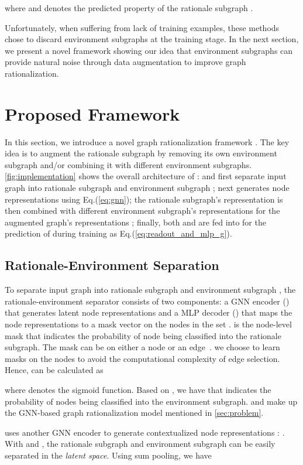 \documentclass[sigconf]{acmart}
\begin{document}
where  and  denotes the predicted property of the rationale subgraph .

Unfortunately, when suffering from lack of training examples, these methods chose to discard environment subgraphs at the training stage. 
In the next section, we present a novel framework showing our idea that environment subgraphs can provide natural noise through data augmentation to improve graph rationalization.
%
 
\section{Proposed Framework}
\label{sec:method}
In this section, we introduce a novel graph rationalization framework \method. The key idea is to augment the rationale subgraph by removing its own environment subgraph and/or combining it with different environment subgraphs. \cref{fig:implementation} shows the overall architecture of \method:
 and  first separate input graph  into rationale subgraph  and environment subgraph ;
 next generates node representations  using Eq.(\ref{eq:gnn}); 
the rationale subgraph's representation  is then combined with different environment subgraph's representations  for the augmented graph's representations ; 
finally, both  and  are fed into  for the prediction of  during training as Eq.(\ref{eq:readout_and_mlp_g}).

\subsection{Rationale-Environment Separation} 
\label{sec:gnnsep}
To separate input graph  into rationale subgraph  and environment subgraph , the rationale-environment separator consists of two components: a GNN encoder () that generates latent node representations and a MLP decoder () that maps the node representations to a mask vector  on the nodes in the set .  is the node-level mask that indicates the probability of node  being classified into the rationale subgraph.
The mask can be on either a node or an edge~\cite{wu2022discovering}. we choose to learn masks on the nodes to avoid the computational complexity of edge selection. Hence,  can be calculated as

where  denotes the sigmoid function. Based on , we have  that indicates the probability of nodes being classified into the environment subgraph.  and  make up the GNN-based graph rationalization model  mentioned in \cref{sec:problem}.

\method uses another GNN encoder to generate contextualized node representations : .
With  and , the rationale subgraph and environment subgraph can be easily separated in the \emph{latent space}. Using sum pooling, we have 
\end{document}
